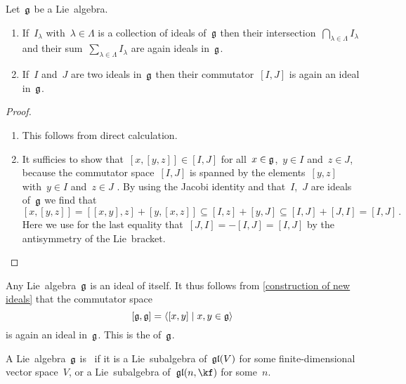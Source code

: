 \begin{proposition}
  \label{construction of new ideals}
  Let~$\mathfrak{g}$ be a Lie~algebra.
  \begin{enumerate}
    \item
    If~$I_\lambda$ with~$\lambda \in \Lambda$ is a collection of ideals of~$\mathfrak{g}$ then their intersection~$\bigcap_{\lambda \in \Lambda} I_\lambda$ and their sum~$\sum_{\lambda \in \Lambda} I_\lambda$ are again ideals in~$\mathfrak{g}$.
    \item
    If~$I$ and~$J$ are two ideals in~$\mathfrak{g}$ then their commutator~$[I,J]$ is again an ideal in~$\mathfrak{g}$.
  \end{enumerate}
\end{proposition}


\begin{proof}
  \leavevmode
  \begin{enumerate}
    \item
      This follows from direct calculation.
    \item
      It sufficies to show that~$[x,[y,z]] \in [I,J]$ for all~$x \in \mathfrak{g}$,~$y \in I$ and~$z \in J$, because the commutator space~$[I,J]$ is spanned by the elements~$[y,z]$ with~$y \in I$ and~$z \in J$ .
      By using the Jacobi identity and that~$I$,~$J$ are ideals of~$\mathfrak{g}$ we find that
      \[
        [x,[y,z]]
        =
        [[x,y], z] + [y, [x,z]]
        \subseteq
        [I, z] + [y, J]
        \subseteq
        [I, J] + [J, I]
        =
        [I,J] \,.
      \]
      Here we use for the last equality that~$[J,I] = -[I,J] = [I,J]$ by the antisymmetry of the Lie~bracket.
   \qedhere
 \end{enumerate}
\end{proof}


\begin{example}
  Any Lie~algebra~$\mathfrak{g}$ is an ideal of itself.
  It thus follows from \cref{construction of new ideals} that the commutator space
  \[
    [\glie, \glie]
    =
    \gen{ [x,y] \suchthat x, y \in \glie }
  \]
  is again an ideal in~$\mathfrak{g}$.
  This is the  of~$\mathfrak{g}$.
\end{example}


\begin{definition}
  A Lie~algebra~$\mathfrak{g}$ is~ if it is a Lie~subalgebra of~$\mathfrak{gl}(V)$ for some finite-dimensional vector space~$V$, or a Lie~subalgebra of~$\gllie(n, \kf)$ for some~$n$.
\end{definition}


